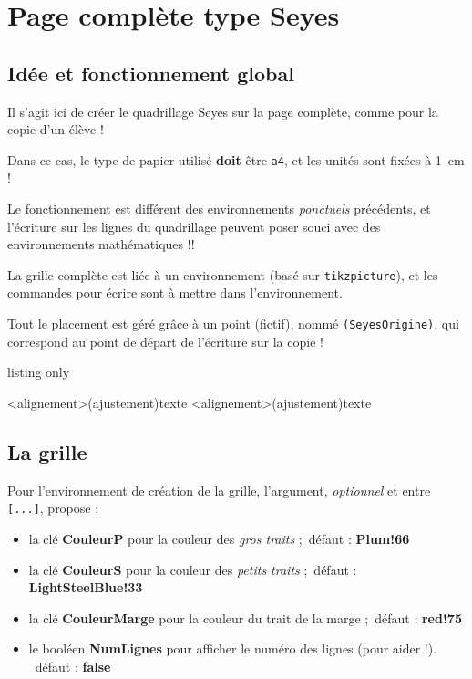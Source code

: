 \documentclass[a4paper]{article}
\newcommand\Cle[1]{{\bfseries\sffamily\textlangle #1\textrangle}}
\begin{document}
\pagebreak

\section{Page complète type Seyes}

\subsection{Idée et fonctionnement global}

Il s'agit ici de créer le quadrillage Seyes sur la page complète, comme pour la copie d'un élève !

Dans ce cas, le type de papier utilisé \textbf{doit} être \texttt{a4}, et les unités sont fixées à 1~cm !

\smallskip

\faBomb{} Le fonctionnement est différent des environnements \textit{ponctuels} précédents, et l'écriture sur les lignes du quadrillage peuvent poser souci avec des environnements mathématiques !!

\medskip

La grille complète est liée à un environnement (basé sur \texttt{tikzpicture}), et les commandes pour écrire sont à mettre dans l'environnement.

\smallskip

Tout le placement est géré grâce à un point (fictif), nommé \texttt{(SeyesOrigine)}, qui correspond au point de départ de l'écriture sur la copie !

\begin{PresentationCode}{listing only}
\begin{PleinePageSeyes}[options]
	\LignePapierSeyes[options]<alignement>(ajustement){texte}
	\ParagraphePapierSeyes[options]<alignement>(ajustement){texte}
\end{PleinePageSeyes}
\end{PresentationCode}

\subsection{La grille}

Pour l'environnement de création de la grille, l'argument, \textit{optionnel} et entre \texttt{[...]}, propose :

\begin{itemize}
	\item la clé \Cle{CouleurP} pour la couleur des \textit{gros traits} ;\hfill~défaut : \Cle{Plum!66}
	\item la clé \Cle{CouleurS} pour la couleur des \textit{petits traits} ;\hfill~défaut : \Cle{LightSteelBlue!33}
	\item la clé \Cle{CouleurMarge} pour la couleur du trait de la marge ;\hfill~défaut : \Cle{red!75}
	\item le booléen \Cle{NumLignes} pour afficher le numéro des lignes (pour aider !). \hfill~défaut : \Cle{false}
\end{itemize}
\end{document}
